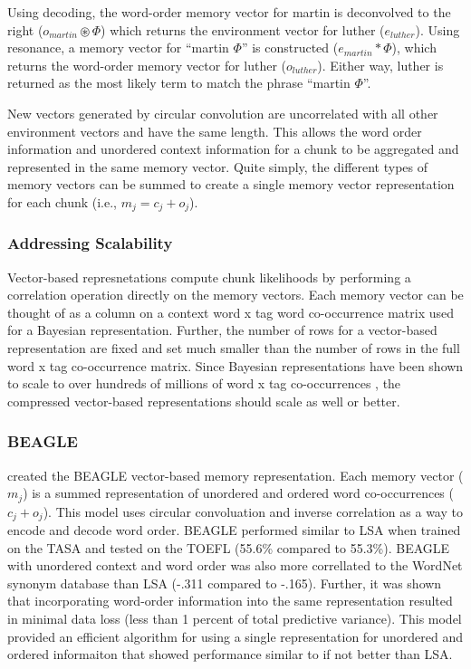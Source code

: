 \documentclass[man,floatsintext]{apa6}
\begin{document}
Using decoding, the word-order memory vector for martin is deconvolved to the right ($o_{martin} \circledast \Phi$) which returns the environment vector for luther ($e_{luther}$).
Using resonance, a memory vector for ``martin $\Phi$'' is constructed ($e_{martin} * \Phi$), which returns the word-order memory vector for luther ($o_{luther}$).
Either way, luther is returned as the most likely term to match the phrase ``martin $\Phi$''.

New vectors generated by circular convolution are uncorrelated with all other environment vectors and have the same length.
This allows the word order information and unordered context information for a chunk to be aggregated and represented in the same memory vector.
Quite simply, the different types of memory vectors can be summed to create a single memory vector representation for each chunk (i.e., $m_{j} = c_{j} + o_{j}$).

\subsubsection{Addressing Scalability}

Vector-based represnetations compute chunk likelihoods by performing a correlation operation directly on the memory vectors.
Each memory vector can be thought of as a column on a context word x tag word co-occurrence matrix used for a Bayesian representation.
Further, the number of rows for a vector-based representation are fixed and set much smaller than the number of rows in the full word x tag co-occurrence matrix.
Since Bayesian representations have been shown to scale to over hundreds of millions of word x tag co-occurrences \parencite{Stanley2013}, the compressed vector-based representations should scale as well or better.

\subsubsection{BEAGLE}

\textcite{Jones2007} created the BEAGLE vector-based memory representation.
Each memory vector ($m_{j}$) is a summed representation of unordered and ordered word co-occurrences ($c_{j} + o_{j}$).
This model uses circular convoluation and inverse correlation as a way to encode and decode word order.
BEAGLE performed similar to LSA when trained on the TASA and tested on the TOEFL (55.6\% compared to 55.3\%).
BEAGLE with unordered context and word order was also more correllated to the WordNet synonym database than LSA (-.311 compared to -.165).
Further, it was shown that incorporating word-order information into the same representation resulted in minimal data loss (less than 1 percent of total predictive variance).
This model provided an efficient algorithm for using a single representation for unordered and ordered informaiton that showed performance similar to if not better than LSA.
\end{document}
